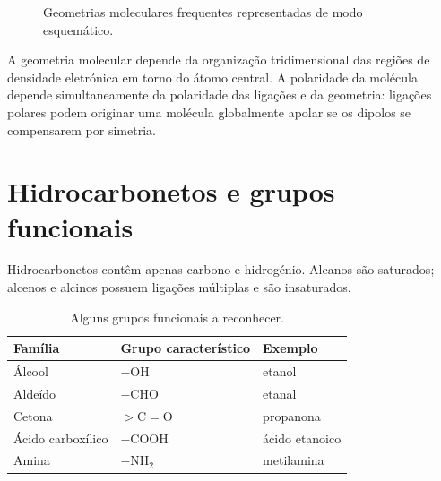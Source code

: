 \documentclass[11pt,a4paper,oneside]{book}
\begin{document}
\begin{figure}[H]
\centering
{}
\caption{Geometrias moleculares frequentes representadas de modo esquemático.}
\end{figure}

\begin{conceito}
A geometria molecular depende da organização tridimensional das regiões de densidade eletrónica em torno do átomo central. A polaridade da molécula depende simultaneamente da polaridade das ligações e da geometria: ligações polares podem originar uma molécula globalmente apolar se os dipolos se compensarem por simetria.
\end{conceito}

\section{Hidrocarbonetos e grupos funcionais}
Hidrocarbonetos contêm apenas carbono e hidrogénio. Alcanos são saturados; alcenos e alcinos possuem ligações múltiplas e são insaturados.

\begin{table}[H]
\centering
\caption{Alguns grupos funcionais a reconhecer.}
\begin{tabular}{lll}
\toprule
Família & Grupo característico & Exemplo \\
\midrule
Álcool & $-\mathrm{OH}$ & etanol \\
Aldeído & $-\mathrm{CHO}$ & etanal \\
Cetona & $>\mathrm{C{=}O}$ & propanona \\
Ácido carboxílico & $-\mathrm{COOH}$ & ácido etanoico \\
Amina & $-\mathrm{NH_2}$ & metilamina \\
\bottomrule
\end{tabular}
\end{table}
\end{document}
